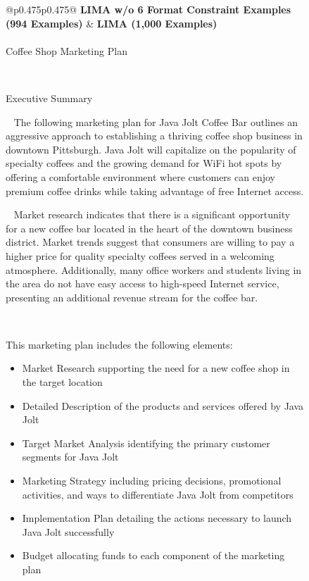  \begin{figure}[p]
    \scriptsize
    \centering
    \begin{tabular}{@{}p{}p{}@{}}
    \toprule
    \textbf{LIMA w/o 6 Format Constraint Examples (994 Examples)} &  \textbf{LIMA (1,000 Examples)}\\
    \midrule
    \\
    \midrule
    Coffee Shop Marketing Plan
    
    ~
    
    Executive Summary

    ~
    The following marketing plan for Java Jolt Coffee Bar outlines an aggressive approach to establishing a thriving coffee shop business in downtown Pittsburgh. Java Jolt will capitalize on the popularity of specialty coffees and the growing demand for WiFi hot spots by offering a comfortable environment where customers can enjoy premium coffee drinks while taking advantage of free Internet access.
    
    ~
    Market research indicates that there is a significant opportunity for a new coffee bar located in the heart of the downtown business district. Market trends suggest that consumers are willing to pay a higher price for quality specialty coffees served in a welcoming atmosphere. Additionally, many office workers and students living in the area do not have easy access to high-speed Internet service, presenting an additional revenue stream for the coffee bar.

    ~
    
    This marketing plan includes the following elements:
    \begin{itemize}[leftmargin=8pt]
    \item Market Research supporting the need for a new coffee shop in the target location
    \item Detailed Description of the products and services offered by Java Jolt
    \item Target Market Analysis identifying the primary customer segments for Java Jolt
    \item Marketing Strategy including pricing decisions, promotional activities, and ways to differentiate Java Jolt from competitors
    \item Implementation Plan detailing the actions necessary to launch Java Jolt successfully
    \item Budget allocating funds to each component of the marketing plan
    \end{itemize}


\end{tabular}
\end{figure}
